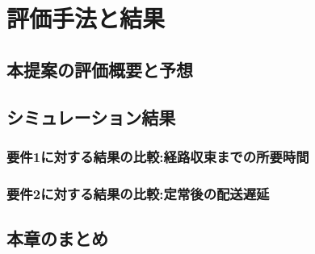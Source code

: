 \chapter{評価手法と結果}
\label{chap:evaluation}
\section{本提案の評価概要と予想}
\section{シミュレーション結果}
\subsection{要件1に対する結果の比較:経路収束までの所要時間}
\subsection{要件2に対する結果の比較:定常後の配送遅延}

\section{本章のまとめ}
